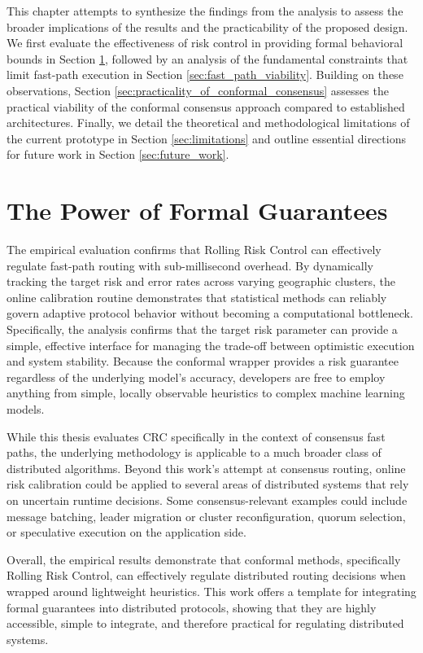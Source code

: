 This chapter attempts to synthesize the findings from the analysis to assess the broader implications of the results and the practicability of the proposed design. We first evaluate the effectiveness of risk control in providing formal behavioral bounds in Section \ref{sec:power_of_formal_guarantees}, followed by an analysis of the fundamental constraints that limit fast-path execution in Section \ref{sec:fast_path_viability}. Building on these observations, Section \ref{sec:practicality_of_conformal_consensus} assesses the practical viability of the conformal consensus approach compared to established architectures. Finally, we detail the theoretical and methodological limitations of the current prototype in Section \ref{sec:limitations} and outline essential directions for future work in Section \ref{sec:future_work}.


\section{The Power of Formal Guarantees}
\label{sec:power_of_formal_guarantees}
The empirical evaluation confirms that Rolling Risk Control can effectively regulate fast-path routing with sub-millisecond overhead. By dynamically tracking the target risk and error rates across varying geographic clusters, the online calibration routine demonstrates that statistical methods can reliably govern adaptive protocol behavior without becoming a computational bottleneck. Specifically, the analysis confirms that the target risk parameter can provide a simple, effective interface for managing the trade-off between optimistic execution and system stability. Because the conformal wrapper provides a risk guarantee regardless of the underlying model’s accuracy, developers are free to employ anything from simple, locally observable heuristics to complex machine learning models.

While this thesis evaluates \gls{CRC} specifically in the context of consensus fast paths, the underlying methodology is applicable to a much broader class of distributed algorithms. Beyond this work's attempt at consensus routing, online risk calibration could be applied to several areas of distributed systems that rely on uncertain runtime decisions. Some consensus-relevant examples could include message batching, leader migration or cluster reconfiguration, quorum selection, or speculative execution on the application side.

Overall, the empirical results demonstrate that conformal methods, specifically Rolling Risk Control, can effectively regulate distributed routing decisions when wrapped around lightweight heuristics. This work offers a template for integrating formal guarantees into distributed protocols, showing that they are highly accessible, simple to integrate, and therefore practical for regulating distributed systems.


